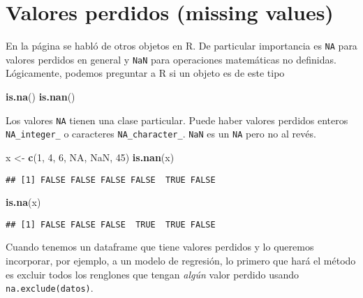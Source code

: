 \documentclass[]{article}
\newenvironment{Shaded}{\begin{snugshade}}{\end{snugshade}}
\newcommand{\KeywordTok}[1]{\textcolor[rgb]{0.13,0.29,0.53}{\textbf{{#1}}}}
\newcommand{\DecValTok}[1]{\textcolor[rgb]{0.00,0.00,0.81}{{#1}}}
\newcommand{\StringTok}[1]{\textcolor[rgb]{0.31,0.60,0.02}{{#1}}}
\newcommand{\OtherTok}[1]{\textcolor[rgb]{0.56,0.35,0.01}{{#1}}}
\newcommand{\NormalTok}[1]{{#1}}
\begin{document}
\section{Valores perdidos (missing
values)}\label{valores-perdidos-missing-values}

En la página \pageref{otros-objetos-importantes} se habló de otros
objetos en R. De particular importancia es \texttt{NA} para valores
perdidos en general y \texttt{NaN} para operaciones matemáticas no
definidas. Lógicamente, podemos preguntar a R si un objeto es de este
tipo

\begin{Shaded}
\begin{Highlighting}[]
\KeywordTok{is.na}\NormalTok{()}
\KeywordTok{is.nan}\NormalTok{()}
\end{Highlighting}
\end{Shaded}

Los valores \texttt{NA} tienen una clase particular. Puede haber valores
perdidos enteros \texttt{NA\_integer\_} o caracteres
\texttt{NA\_character\_}. \texttt{NaN} es un \texttt{NA} pero no al
revés.

\begin{Shaded}
\begin{Highlighting}[]
\NormalTok{x <-}\StringTok{ }\KeywordTok{c}\NormalTok{(}\DecValTok{1}\NormalTok{, }\DecValTok{4}\NormalTok{, }\DecValTok{6}\NormalTok{, }\OtherTok{NA}\NormalTok{, }\OtherTok{NaN}\NormalTok{, }\DecValTok{45}\NormalTok{)}
\KeywordTok{is.nan}\NormalTok{(x)}
\end{Highlighting}
\end{Shaded}

\begin{verbatim}
## [1] FALSE FALSE FALSE FALSE  TRUE FALSE
\end{verbatim}

\begin{Shaded}
\begin{Highlighting}[]
\KeywordTok{is.na}\NormalTok{(x)}
\end{Highlighting}
\end{Shaded}

\begin{verbatim}
## [1] FALSE FALSE FALSE  TRUE  TRUE FALSE
\end{verbatim}

Cuando tenemos un dataframe que tiene valores perdidos y lo queremos
incorporar, por ejemplo, a un modelo de regresión, lo primero que hará
el método es excluir todos los renglones que tengan \emph{algún} valor
perdido usando \texttt{na.exclude(datos)}.
\end{document}
